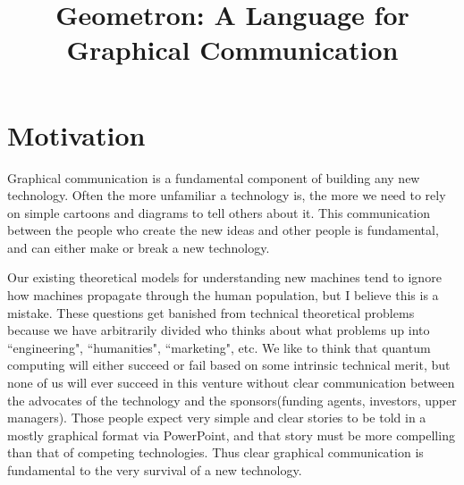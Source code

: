 \documentclass[11pt]{article}
\begin{document}
\title{Geometron: A Language for Graphical Communication}



\section{Motivation}

    Graphical communication is a fundamental component of building any new technology.  Often the more unfamiliar a technology is, the more we need to rely on simple cartoons and diagrams to tell others about it.  This communication between the people who create the new ideas and other people is fundamental, and can either make or break a new technology.   

    Our existing theoretical models for understanding new machines tend to ignore how machines propagate through the human population, but I believe this is a mistake.  These questions get banished from technical theoretical problems because we have arbitrarily divided who thinks about what problems up into ``engineering", ``humanities", ``marketing", etc.  We like to think that quantum computing will either succeed or fail based on some intrinsic technical merit, but none of us will ever succeed in this venture without clear communication between the advocates of the technology and the sponsors(funding agents, investors, upper managers).  Those people expect very simple and clear stories to be told in a mostly graphical format via PowerPoint, and that story must be more compelling than that of competing technologies.  Thus clear graphical communication is fundamental to the very survival of a new technology.  
\end{document}
